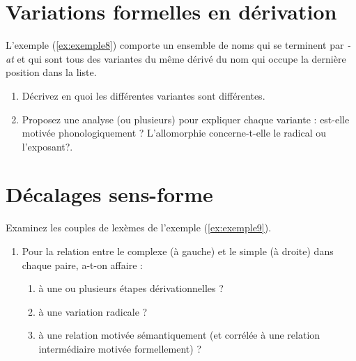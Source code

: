 \section{Variations formelles en dérivation}

L'exemple (\ref{ex:exemple8})  comporte un ensemble de noms qui se terminent par \emph{-at} et qui sont tous des variantes du même dérivé du  nom qui occupe la dernière position dans la liste. \\

\vspace{-.5\baselineskip}
\begin{exe}
\ex \label{ex:exemple8}\exhuit
\end{exe}

\begin{enumerate}
\item Décrivez en quoi les différentes variantes sont différentes. \item Proposez une analyse (ou plusieurs) pour expliquer chaque variante : est-elle motivée phonologiquement ? L'allomorphie concerne-t-elle le radical ou l'exposant?.
\end{enumerate}


\section{Décalages sens-forme}

Examinez les couples de lexèmes de l'exemple (\ref{ex:exemple9}). \\

\vspace{-.5\baselineskip}
\begin{exe}
\ex \label{ex:exemple9}\begin{xlist}
\ex \cartesianismeexneuf
\ex  \urbanismeexneuf
\ex \historicismeexneuf
\ex \cellularismeexneuf
\end{xlist}
\end{exe}

\begin{enumerate}
\item Pour la relation entre le complexe (à gauche) et le simple (à droite) dans chaque paire, a-t-on affaire :
\begin{enumerate}
\item à une ou plusieurs étapes dérivationnelles ?
\item à une variation radicale ?
\item à une relation motivée sémantiquement (et corrélée à une relation intermédiaire motivée formellement) ?
\end{enumerate}
\end{enumerate}




